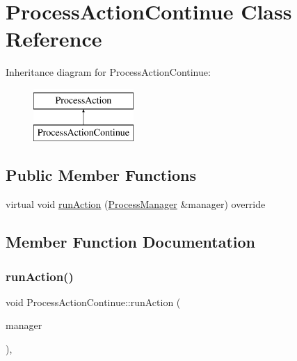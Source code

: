 \hypertarget{classProcessActionContinue}{}\section{Process\+Action\+Continue Class Reference}
\label{classProcessActionContinue}
Inheritance diagram for Process\+Action\+Continue\+:\begin{figure}[H]
\begin{center}
\leavevmode
\includegraphics[height=2.000000cm]{classProcessActionContinue}
\end{center}
\end{figure}
\subsection*{Public Member Functions}
\begin{DoxyCompactItemize}
\item 
virtual void \hyperlink{classProcessActionContinue_a5ed33d879b9caaf8c94ac5703696eb48}{run\+Action} (\hyperlink{classProcessManager}{Process\+Manager} \&manager) override
\end{DoxyCompactItemize}


\subsection{Member Function Documentation}
\mbox{\label{classProcessActionContinue_a5ed33d879b9caaf8c94ac5703696eb48}} 
\subsubsection{\texorpdfstring{run\+Action()}{runAction()}}
{\footnotesize\ttfamily void Process\+Action\+Continue\+::run\+Action (\begin{DoxyParamCaption}\item[{\hyperlink{classProcessManager}{Process\+Manager} \&}]{manager }\end{DoxyParamCaption})\hspace{0.3cm}{\ttfamily [override]}, {\ttfamily [virtual]}}

